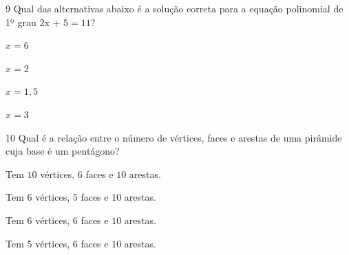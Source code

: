 \num{9}  Qual das alternativas abaixo é a solução correta para a equação
polinomial de 1º grau $2$x + $5 = 11$?

\begin{escolha}
\item $x = 6$
\item $x = 2$
\item $x = 1,5$
\item $x = 3$
\end{escolha}



\num{10} Qual é a relação entre o número de vértices, faces e arestas de uma
pirâmide cuja base é um pentágono?

\begin{escolha}
\item Tem $10$ vértices, $6$ faces e $10$ arestas.
\item Tem $6$ vértices, $5$ faces e $10$ arestas.
\item Tem $6$ vértices, $6$ faces e $10$ arestas.
\item Tem $5$ vértices, $6$ faces e $10$ arestas.
\end{escolha}


